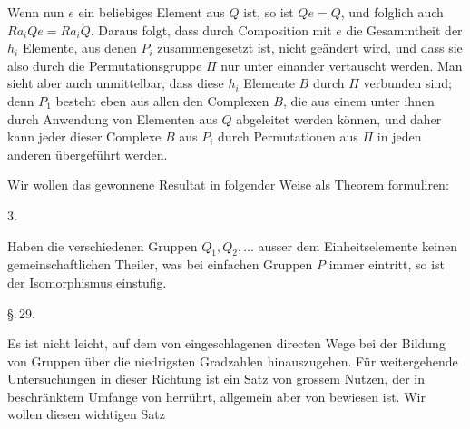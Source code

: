 Wenn nun $e$ ein beliebiges Element aus $Q$ ist, so ist $Qe = Q$,
und folglich auch $Ra_iQe = Ra_iQ$. Daraus folgt, dass durch
Composition mit $e$ die Gesammtheit der $h_i$ Elemente, aus denen
$P_i$ zusammengesetzt ist, nicht geändert wird, und dass sie also
durch die Permutationsgruppe $\Pi$ nur unter einander vertauscht
werden. Man sieht aber auch unmittelbar, dass diese $h_i$ Elemente $B$ durch $\Pi$  verbunden sind; denn $P_1$ besteht eben
aus allen den Complexen $B$, die aus einem unter ihnen durch
Anwendung von Elementen aus $Q$ abgeleitet werden können, und
daher kann jeder dieser Complexe $B$ aus $P_i$ durch Permutationen
aus $\Pi$ in jeden anderen übergeführt werden.

Wir wollen das gewonnene Resultat in folgender Weise als
Theorem formuliren:

3.\ 

Haben die verschiedenen Gruppen $Q_1, Q_2, \ldots$ ausser dem
Einheitselemente keinen gemeinschaftlichen Theiler, was bei einfachen Gruppen $P$ immer eintritt, so ist der Isomorphismus einstufig.

\begin{center}
\S.\,29.

\end{center}

Es ist nicht leicht, auf dem von  eingeschlagenen
directen Wege bei der Bildung von Gruppen über die niedrigsten
Gradzahlen hinauszugehen. Für weitergehende Untersuchungen
in dieser Richtung ist ein Satz von grossem Nutzen, der in beschränktem Umfange von  herrührt, allgemein aber
von  bewiesen ist. Wir wollen diesen wichtigen Satz
